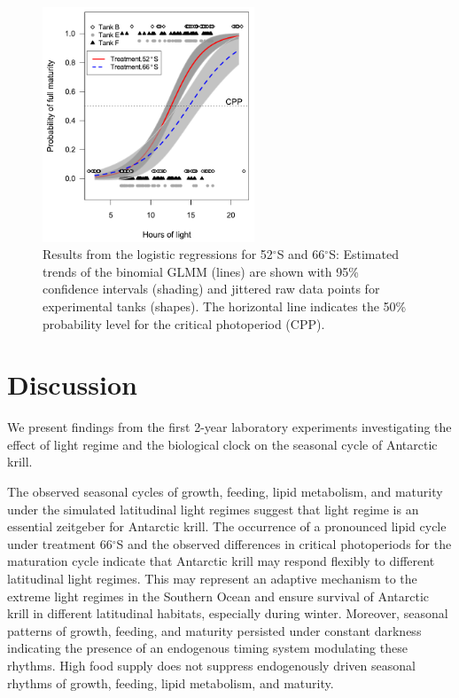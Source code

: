 
\begin{figure}
        \centering
        \includegraphics[height=7cm, keepaspectratio]{../Figures/Pub2_7.pdf}
        \caption{Results from the logistic regressions for 52$^{\circ}$S and
        66$^{\circ}$S: Estimated trends of the binomial GLMM (lines) are shown
        with 95\% confidence intervals (shading) and jittered raw data points
        for experimental tanks (shapes). The horizontal line indicates the 50\%
        probability level for the critical photoperiod (CPP).}
        \label{Pub2_7}
\end{figure}

\section{Discussion}

We present findings from the first 2-year laboratory experiments investigating
the effect of light regime and the biological clock on the seasonal cycle of
Antarctic krill. 

The observed seasonal cycles of growth, feeding, lipid metabolism, and maturity
under the simulated latitudinal light regimes suggest that light regime is an
essential zeitgeber for Antarctic krill. The occurrence of a pronounced lipid
cycle under treatment 66$^{\circ}$S and the observed differences in critical
photoperiods for the maturation cycle indicate that Antarctic krill may respond
flexibly to different latitudinal light regimes. This may represent an adaptive
mechanism to the extreme light regimes in the Southern Ocean and ensure
survival of Antarctic krill in different latitudinal habitats, especially
during winter. Moreover, seasonal patterns of growth, feeding, and maturity
persisted under constant darkness indicating the presence of an endogenous
timing system modulating these rhythms. High food supply does not suppress
endogenously driven seasonal rhythms of growth, feeding, lipid metabolism, and
maturity. 

